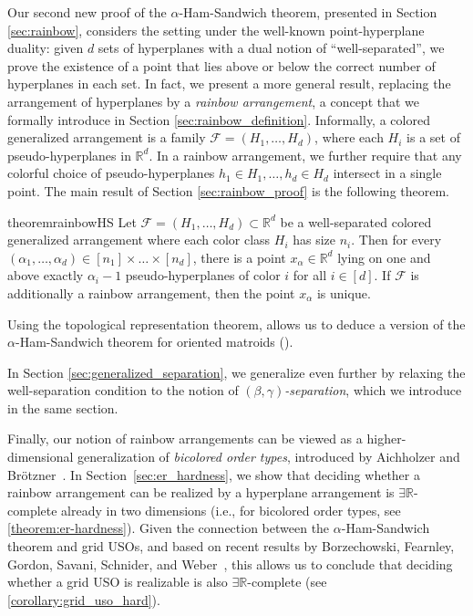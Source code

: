 \documentclass[a4paper,UKenglish,cleveref, autoref, thm-restate, nolineno]{socg-lipics-v2021}
\newcommand{\R}{\mathbb{R}}
\newcommand{\ER}{\exists\mathbb{R}}
\begin{document}
Our second new proof of the $\alpha$-Ham-Sandwich theorem, presented in Section \ref{sec:rainbow}, considers the setting under the well-known point-hyperplane duality: given $d$ sets of hyperplanes with a dual notion of ``well-separated'', we prove the existence of a point that lies above or below the correct number of hyperplanes in each set. In fact, we present a more general result, replacing the arrangement of hyperplanes by a \emph{rainbow arrangement}, a concept that we formally introduce in Section \ref{sec:rainbow_definition}. Informally, a colored generalized arrangement is a family $\mathcal{F}=(H_1, \ldots, H_d)$, where each $H_i$ is a set of pseudo-hyperplanes in $\R^d$. In a rainbow arrangement, we further require that any colorful choice of pseudo-hyperplanes $h_1\in H_1,\ldots,h_d\in H_d$ intersect in a single point. The main result of Section \ref{sec:rainbow_proof} is the following theorem.

\begin{restatable}{theorem}{rainbowHS}\label{thm:rainbowHS}
Let $\mathcal{F}=(H_1, \ldots,H_d)\subset\R^d$ be a well-separated colored generalized arrangement where each color class $H_i$ has size $n_i$. Then for every $(\alpha_1, \dots, \alpha_d) \in [n_1] \times \dots \times [n_d]$, there is a point $x_{\alpha} \in \mathbb{R}^d$ lying on one and above exactly $\alpha_i - 1$ pseudo-hyperplanes of color $i$ for all $i \in [d]$.
If $\mathcal{F}$ is additionally a rainbow arrangement, then the point $x_\alpha$ is unique.
\end{restatable}

Using the topological representation theorem,  allows us to deduce a version of the $\alpha$-Ham-Sandwich theorem for oriented matroids ().

In Section \ref{sec:generalized_separation}, we generalize  even further by relaxing the well-separation condition to the notion of \emph{$(\beta,\gamma)$-separation}, which we introduce in the same section.

Finally, our notion of rainbow arrangements can be viewed as a higher-dimensional generalization of \emph{bicolored order types}, introduced by Aichholzer and Br\"{o}tzner~\cite{aichholzerBicoloredOrderTypes2024}. In Section~\ref{sec:er_hardness}, we show that deciding whether a rainbow arrangement can be realized by a hyperplane arrangement is $\ER$-complete already in two dimensions (i.e., for bicolored order types, see \cref{theorem:er-hardness}). Given the connection between the $\alpha$-Ham-Sandwich theorem and grid USOs, and based on recent results by Borzechowski, Fearnley, Gordon, Savani, Schnider, and Weber~\cite{borzechowskiTwoChoicesAre2024}, this allows us to conclude that deciding whether a grid USO is realizable is also $\ER$-complete (see \cref{corollary:grid_uso_hard}).
\end{document}
